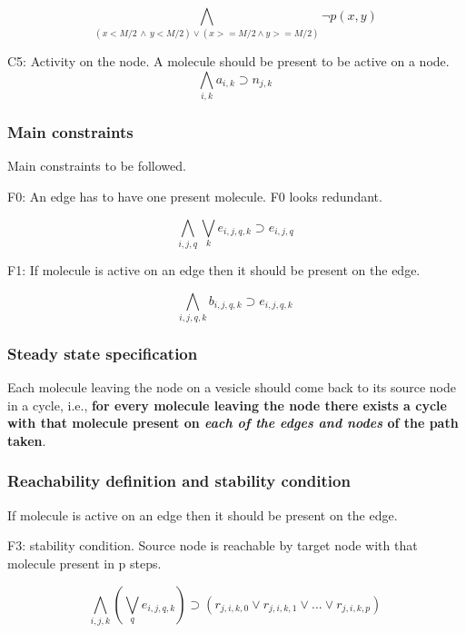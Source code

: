 \[ \bigwedge\limits_{(x < M/2 \, \land  \, y < M/2) \lor  (x >= M/2 \land y >= M/2)} \neg p(x,y) \, \]

C5: Activity on the node. A molecule should be present to be active on a node.  
\[ \bigwedge\limits_{i,k} a_{i,k} \supset n_{j,k} \, \]  




\subsubsection{Main constraints}
Main constraints to be followed. \newline

F0:  An edge has to have one present molecule. F0 looks redundant.

\[ \bigwedge\limits_{i,j,q} \bigvee_k e_{i,j,q,k} \supset e_{i,j,q} \, \]  

F1: If molecule is active on an edge then it should be present on the edge.

\[ \bigwedge\limits_{i,j,q,k} b_{i,j,q,k} \supset e_{i,j,q,k}\, \]



\subsubsection{Steady state specification}
Each molecule leaving the node on a vesicle should come back to its source node in a cycle, i.e., \textbf{for every molecule leaving the node there exists a cycle with that molecule present on \textit{each of the edges and nodes} of the path taken}.

\subsubsection{Reachability definition and stability condition}
If molecule is active on an edge then it should be present on the edge. \newline


F3: stability condition. Source node is reachable by target node with that molecule present in p steps.


\[ \bigwedge\limits_{i,j,k} (\bigvee_{q} e_{i,j,q,k}) \supset (r_{j,i,k,0}  \lor r_{j,i,k,1} \lor ... \lor r_{j,i,k,p}) \, \]

